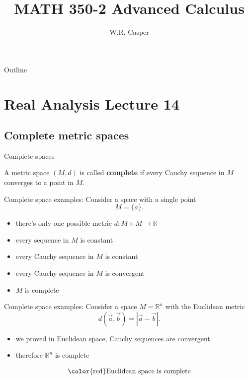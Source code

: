 \documentclass{beamer}
\title{MATH 350-2 Advanced Calculus}
\subtitle
{} %
\author[W.R. Casper] %
{W.R. Casper}
\institute[California State University Fullerton] %
{
  Department of Mathematics\\
  California State University Fullerton}
\begin{document}
\begin{frame}
  \titlepage
\end{frame}

\begin{frame}{Outline}
  \tableofcontents
\end{frame}



\section{Real Analysis Lecture 14}

\subsection{Complete metric spaces}

\begin{frame}{Complete spaces}
\begin{defn}
A metric space $(M,d)$ is called \textbf{complete} if every Cauchy sequence in $M$ converges to a point in $M$.
\end{defn}
\end{frame}

\begin{frame}{Complete space examples:}
Consider a space with a single point
$$M = \{a\}.$$
\begin{itemize}
\pause
  \item there's only one possible metric $d: M\times M\rightarrow\mathbb R$
\pause
  \item every sequence in $M$ is constant
\pause
  \item every Cauchy sequence in $M$ is constant
\pause
  \item every Cauchy sequence in $M$ is convergent
\pause
  \item $M$ is complete
\end{itemize}
\end{frame}

\begin{frame}{Complete space examples:}
Consider a space $M = \mathbb R^n$ with the Euclidean metric
$$d(\vec a,\vec b) = |\vec a-\vec b|.$$
\begin{itemize}
\pause
  \item we proved in Euclidean space, Cauchy sequences are convergent
\pause
  \item therefore $\mathbb R^n$ is complete
\end{itemize}
\pause
  $$\text{\color{red}Euclidean space is complete}$$
\end{frame}
\end{document}
